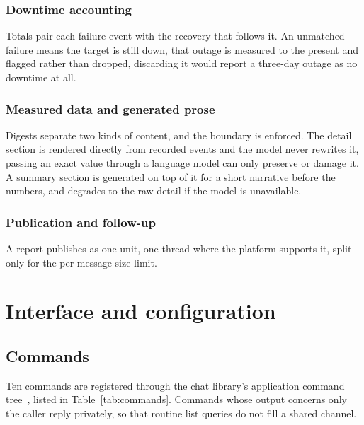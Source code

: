 \documentclass[11pt,a4paper]{article}
\let\stdsection\section
\renewcommand{\section}{\clearpage\stdsection}
\begin{document}
\subsubsection{Downtime accounting}

Totals pair each failure event with the recovery that follows it. An unmatched
failure means the target is still down, that outage is measured to the present and
flagged rather than dropped, discarding it would report a three-day outage as no
downtime at all.

\subsubsection{Measured data and generated prose}

Digests separate two kinds of content, and the boundary is enforced. The detail
section is rendered directly from recorded events and the model never rewrites it,
passing an exact value through a language model can only preserve or damage it.
A summary section is generated on top of it for a short narrative before the
numbers, and degrades to the raw detail if the model is unavailable.

\subsubsection{Publication and follow-up}

A report publishes as one unit, one thread where the platform supports it, split
only for the per-message size limit.

\section{Interface and configuration}

\subsection{Commands}

Ten commands are registered through the chat library's application command
tree~\cite{discordpy, discordapi}, listed in Table~\ref{tab:commands}. Commands whose
output concerns only the caller reply privately, so that routine list queries do not
fill a shared channel.
\end{document}
